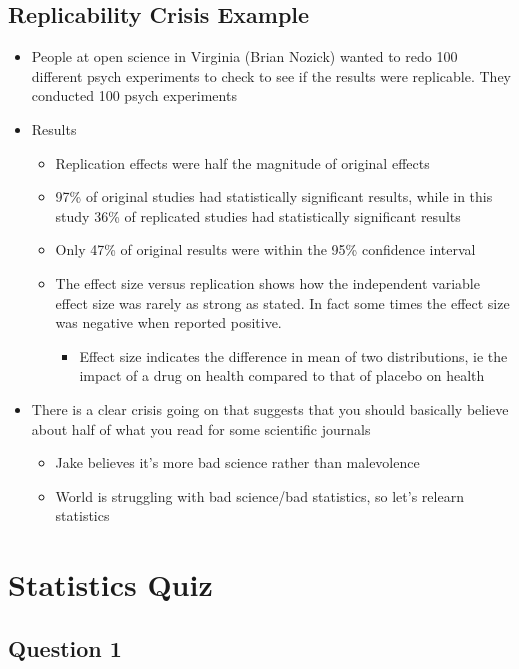 \subsection{Replicability Crisis Example}
\begin{itemize}
    \item People at open science in Virginia (Brian Nozick) wanted to redo 100 different psych experiments to check to see if the results were replicable. They conducted 100 psych experiments 
    \item Results
    \begin{itemize}
        \item Replication effects were half the magnitude of original effects
        \item 97\% of original studies had statistically significant results, while in this study 36\% of replicated studies had statistically significant results
        \item Only 47\% of original results were within the 95\% confidence interval
        \item The effect size versus replication shows how the independent variable effect size was rarely as strong as stated. In fact some times the effect size was negative when reported positive. 
        \begin{itemize}
            \item Effect size indicates the difference in mean of two distributions, ie the impact of a drug on health compared to that of placebo on health
        \end{itemize}
    \end{itemize}
    \item There is a clear crisis going on that suggests that you should basically believe about half of what you read for some scientific journals
    \begin{itemize}
        \item Jake believes it’s more bad science rather than malevolence
        \item World is struggling with bad science/bad statistics, so let’s relearn statistics
    \end{itemize}
\end{itemize}

\section{Statistics Quiz}
\subsection{Question 1}
